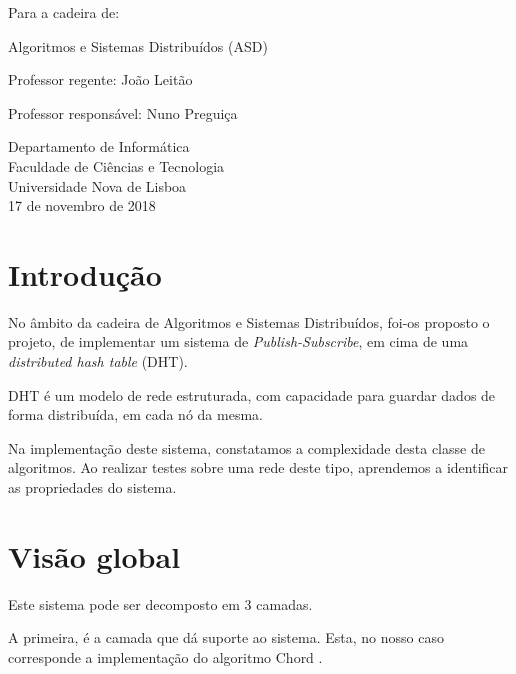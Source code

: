 \documentclass[12pt]{article}
\begin{document}
\begin{titlepage}
\begin{center}
        \vspace{0.5cm}
        
        Para a cadeira de:
        
        Algoritmos e Sistemas Distribuídos (ASD)
        
        \vspace{0.5cm}

		Professor regente: 
		João Leitão
		
		Professor responsável:
		Nuno Preguiça
		
        \vspace{0.5cm}
                
        Departamento de Informática\\
        Faculdade de Ciências e Tecnologia\\
        Universidade Nova de Lisboa\\
        17 de novembro de 2018
    \end{center}
\end{titlepage}

\newpage
\tableofcontents

\newpage
\listoffigures

\newpage
\listoftables

\newpage
\section{Introdução}

No âmbito da cadeira de Algoritmos e Sistemas Distribuídos, foi-os proposto o projeto, de implementar um sistema de \emph{Publish-Subscribe}, em cima de uma \emph{distributed hash table} (DHT).

DHT é um modelo de rede estruturada, com capacidade para guardar dados de forma distribuída, em cada nó da mesma.

Na implementação deste sistema, constatamos a complexidade desta classe de algoritmos. Ao realizar testes sobre uma rede deste tipo, aprendemos a identificar as propriedades do sistema.

\newpage
\section{Visão global}

Este sistema pode ser decomposto em 3 camadas. 

A primeira, é a camada que dá suporte ao sistema. Esta, no nosso caso corresponde a implementação do algoritmo Chord \cite{b2}. 
\end{document}
